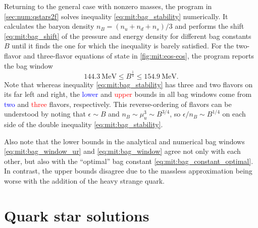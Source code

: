 Returning to the general case with nonzero masses,
the program in \cref{sec:num:qstars2f} solves inequality \eqref{eq:mit:bag_stability} numerically.
It calculates the baryon density $n_B = (n_u+n_d+n_s)/3$
and performs the shift \eqref{eq:mit:bag_shift} of the pressure and energy density for different bag constants $B$
until it finds the one for which the inequality is barely satisfied.
For the two-flavor and three-flavor equations of state in \cref{fig:mit:eos-eos}, the program reports the bag window
\begin{equation}
	\SI{144.3}{\mega\electronvolt} \leq B^\frac14 \leq \SI{154.9}{\mega\electronvolt} .
\label{eq:mit:bag_window}
\end{equation}
Note that whereas inequality \eqref{eq:mit:bag_stability} has three and two flavors on its far left and right,
the \textcolor{blue}{lower} and \textcolor{red}{upper} bounds in all bag windows come from \textcolor{blue}{two} and \textcolor{red}{three} flavors, respectively.
This reverse-ordering of flavors can be understood by noting that $\epsilon \sim B$ and $n_B \sim \mu_u^3 \sim B^{3/4}$, so $\epsilon / n_B \sim B^{1/4}$ on each side of the double inequality \eqref{eq:mit:bag_stability}.

Also note that the lower bounds in the analytical and numerical bag windows \eqref{eq:mit:bag_window_ur} and \eqref{eq:mit:bag_window}
agree not only with each other, but also with the ``optimal'' bag constant \eqref{eq:mit:bag_constant_optimal}.
In contrast, the upper bounds disagree due to the massless approximation being worse with the addition of the heavy strange quark.


\pagebreak
\section{Quark star solutions}

